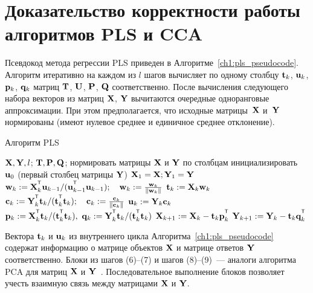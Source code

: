 \section{Доказательство корректности работы алгоритмов PLS и CCA}

Псевдокод метода регрессии PLS приведен в Алгоритме~\ref{ch1:pls_pseudocode}.
Алгоритм итеративно на каждом из $l$ шагов вычисляет по одному столбцу $\mathbf{t}_k$, $\mathbf{u}_k$, $\mathbf{p}_k$, $\mathbf{q}_k$ матриц $\mathbf{T}$, $\mathbf{U}$, $\mathbf{P}$, $\mathbf{Q}$ соответственно. 
После вычисления следующего набора векторов из матриц $\mathbf{X}$, $\mathbf{Y}$ вычитаются очередные одноранговые аппроксимации. 
При этом предполагается, что исходные матрицы~$\mathbf{X}$ и~$\mathbf{Y}$ нормированы (имеют нулевое среднее и единичное среднее отклонение).

\begin{algorithm}[h]
	\caption{Алгоритм PLS}
	\label{ch1:pls_pseudocode}
	\begin{algorithmic}[1]
		\REQUIRE $\mathbf{X}, \mathbf{Y}, l$;
		\ENSURE $\mathbf{T}, \mathbf{P}, \mathbf{Q}$;
		\STATE нормировать матрицы $\mathbf{X}$ и $\mathbf{Y}$ по столбцам
		\STATE инициализировать $\mathbf{u}_0$ (первый столбец матрицы $\mathbf{Y}$)
		\STATE $\mathbf{X}_1 = \mathbf{X}; \mathbf{Y}_1 = \mathbf{Y}$
		\REPEAT
		\vspace{0.1cm}
		\STATE $\bw_k := \bX_k^{\T} \bu_{k-1} / (\bu_{k-1}^{\T} \bu_{k-1}); \quad \bw_k: = \frac{\bw_k}{\| \bw_k \|}$
		\vspace{0.1cm}
		\STATE $\mathbf{t}_k := \mathbf{X}_k \mathbf{w}_k$
		\vspace{0.1cm}
		\STATE $\bc_k := \bY_k^{\T} \bt_k / (\bt_k^{\T} \bt_k); \quad \bc_k: = \frac{\bc_k}{\| \bc_k \|}$
		\vspace{0.1cm}
		\STATE $\mathbf{u}_k := \mathbf{Y}_k \mathbf{c}_k$
		\vspace{0.1cm}
		\STATE $\bp_k:= \bX_k^{\T}\bt_k/(\bt_k^{\T}\bt_k),\ 
		\bq_k := \bY_k^{\T}\bt_k/(\bt_k^{\T}\bt_k)$
		\vspace{0.2cm}
		\STATE $\bX_{k+1} :=  \bX_k - \bt_k \bp_k^{\T}$
		\vspace{0.2cm}
		\STATE $\bY_{k + 1} :=  \bY_k - \bt_k \bq_k^{\T}$ 
		\ENDFOR
	\end{algorithmic}
\end{algorithm}

Вектора $\mathbf{t}_k$ и $\mathbf{u}_k$ из внутреннего цикла Алгоритма~\ref{ch1:pls_pseudocode}
содержат информацию о матрице объектов $\mathbf{X}$ и матрице ответов $\mathbf{Y}$ соответственно. 
Блоки из шагов (6)--(7) и шагов (8)--(9)~--- аналоги алгоритма PCA для матриц $\mathbf{X}$ и $\mathbf{Y}$~\cite{geladi1988pls}. 
Последовательное выполнение блоков позволяет учесть взаимную связь между матрицами $\mathbf{X}$ и $\mathbf{Y}$.

